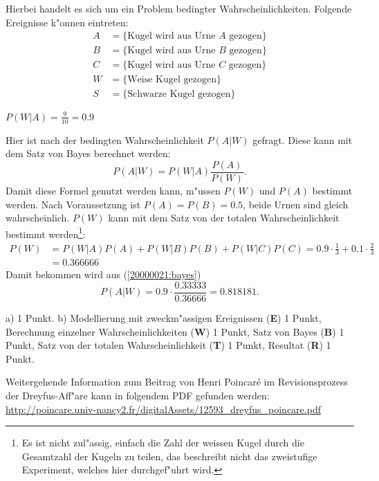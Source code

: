 \begin{loesung}
Hierbei handelt es sich um ein Problem bedingter Wahrscheinlichkeiten.
Folgende Ereignisse k"onnen eintreten:
\begin{align*}
A&=\{\text{Kugel wird aus Urne $A$ gezogen}\}\\
B&=\{\text{Kugel wird aus Urne $B$ gezogen}\}\\
C&=\{\text{Kugel wird aus Urne $C$ gezogen}\}\\
W&=\{\text{Weise Kugel gezogen}\}\\
S&=\{\text{Schwarze Kugel gezogen}\}
\end{align*}
\begin{teilaufgaben}
\item $P(W|A)=\frac{9}{10}= 0.9$
\item Hier ist nach der bedingten Wahrscheinlichkeit $P(A|W)$ gefragt.
Diese kann mit dem Satz von Bayes berechnet werden:
\begin{equation}
P(A|W)=P(W|A)\frac{P(A)}{P(W)}.
\label{20000021:bayes}
\end{equation}
Damit diese Formel genutzt werden kann, m"ussen $P(W)$ und $P(A)$
bestimmt werden.
Nach Voraussetzung ist $P(A)=P(B)=0.5$, beide Urnen sind gleich
wahrscheinlich. $P(W)$ kann mit dem Satz von der totalen
Wahrscheinlichkeit bestimmt werden\footnote{Es ist nicht zul"assig,
einfach die Zahl der weissen Kugel durch die Gesamtzahl der Kugeln
zu teilen, das beschreibt nicht das zweistufige Experiment, welches hier
durchgef"uhrt wird.}:
\begin{align*}
P(W)&=P(W|A)P(A)+P(W|B)P(B)+P(W|C)P(C)
     =0.9\cdot \frac13+0.1\cdot \frac23
\\
    &=0.366666
\end{align*}
Damit bekommen wird aus
(\ref{20000021:bayes})
\[
P(A|W)=0.9\cdot\frac{0.33333}{0.36666}=0.818181.
\]
\end{teilaufgaben}
\end{loesung}

\begin{bewertung}
a) 1 Punkt.
b) Modellierung mit zweckm"assigen Ereignissen ({\bf E}) 1 Punkt,
Berechnung einzelner Wahrscheinlichkeiten ({\bf W}) 1 Punkt,
Satz von Bayes ({\bf B}) 1 Punkt,
Satz von der totalen Wahrscheinlichkeit ({\bf T}) 1 Punkt,
Resultat ({\bf R}) 1 Punkt.
\end{bewertung}

\begin{diskussion}
Weitergehende Information zum Beitrag von Henri Poincar\'e im Revisionsprozess
der Dreyfus-Aff"are kann in folgendem PDF gefunden werden:
\url{http://poincare.univ-nancy2.fr/digitalAssets/12593_dreyfus_poincare.pdf}
\end{diskussion}
